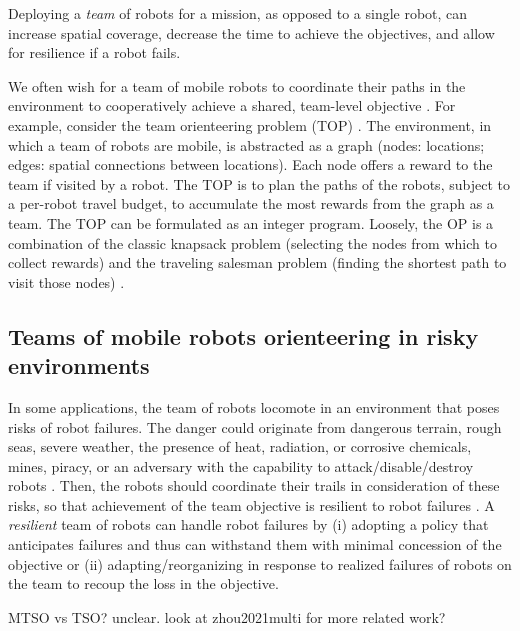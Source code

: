 \documentclass[11pt, oneside]{article}
\begin{document}
Deploying a \emph{team} of robots for a mission, as opposed to a single robot, can increase spatial coverage, decrease the time to achieve the objectives, and allow for resilience if a robot fails.

We often wish for a team of mobile robots to coordinate their paths in the environment to cooperatively achieve a shared, team-level objective \cite{parker2007distributed,lesser1999cooperative}.
For example, consider the team orienteering problem (TOP) \cite{gunawan2016orienteering,vansteenwegen2011orienteering}. 
The environment, in which a team of robots are mobile, is abstracted as a graph (nodes: locations; edges: spatial connections between locations). Each node offers a reward to the team if visited by a robot.
The TOP is to plan the paths of the robots, subject to a per-robot travel budget, to accumulate the most rewards from the graph as a team. The TOP can be formulated as an integer program. Loosely, the OP is a combination of the classic knapsack problem (selecting the nodes from which to collect rewards) and the traveling salesman problem (finding the shortest path to visit those nodes) \cite{gunawan2016orienteering}.

\subsection{Teams of mobile robots orienteering in risky environments}
In some applications, the team of robots locomote in an environment that poses risks of robot failures. 
The danger could originate from dangerous terrain, rough seas, severe weather, the presence of heat, radiation, or corrosive chemicals, mines, piracy, or an adversary with the capability to attack/disable/destroy robots \cite{agmon2017robotic}. Then, the robots should coordinate their trails in consideration of these risks, so that achievement of the team objective is resilient to robot failures \cite{zhou2021multi}. 
A \emph{resilient} team of robots \cite{prorok2021beyond} can handle robot failures by 
(i) adopting a policy that anticipates failures and thus can withstand them with minimal concession of the objective
or
(ii) adapting/reorganizing in response to realized failures of robots on the team to recoup the loss in the objective. 

{\color{red} MTSO vs TSO? unclear. look at zhou2021multi for more related work?}
\end{document}
